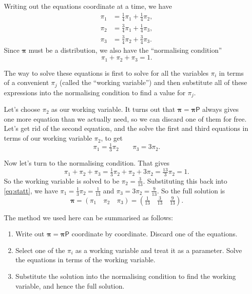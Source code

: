 \documentclass[
  a4paper,
]{article}
\providecommand{\tightlist}{%
  \setlength{\itemsep}{0pt}\setlength{\parskip}{0pt}}
\theoremstyle{definition}
\theoremstyle{definition}
\theoremstyle{definition}
\theoremstyle{remark}
\begin{document}
Writing out the equations coordinate at a time, we have
\begin{align*}
    \pi_1 &= \tfrac14\pi_1+\tfrac14\pi_2 , \\
    \pi_2 &= \tfrac34\pi_1+\tfrac14\pi_3 , \\
    \pi_3 &= \tfrac34\pi_2+\tfrac34\pi_3 . 
    \end{align*}
Since \(\boldsymbol\pi\) must be a distribution, we also have the ``normalising condition''
\[ \pi_1+\pi_2+\pi_3=1 . \]

The way to solve these equations is first to solve for all the variables \(\pi_i\) in terms of a convenient \(\pi_{j}\) (called the ``working variable'') and then substitute all of these expressions into the normalising condition to find a value for \(\pi_{j}\).

Let's choose \(\pi_2\) as our working variable. It turns out that \(\boldsymbol\pi = \boldsymbol\pi \mathsf{P}\) always gives one more equation than we actually need, so we can discard one of them for free. Let's get rid of the second equation, and the solve the first and third equations in terms of our working variable \(\pi_2\), to get
\begin{equation}
\pi_1=\tfrac13\pi_2 \qquad \pi_3=3\pi_2 . \label{eq:statt}
\end{equation}

Now let's turn to the normalising condition. That gives
\[ \pi_1+\pi_2+\pi_3 = \tfrac13\pi_2+\pi_2+3\pi_2 = \tfrac{13}{3} \pi_2 = 1 .\]
So the working variable is solved to be \(\pi_2 = \frac{3}{13}\). Substituting this back into \eqref{eq:statt}, we have \(\pi_1=\tfrac13\pi_2 = \frac{1}{13}\) and \(\pi_3=3\pi_2 = \frac{9}{13}\). So the full solution is
\[ \boldsymbol \pi = (\pi_1\quad \pi_2\quad \pi_3) = \left(\tfrac{1}{13}\quad \tfrac{3}{13}\quad\tfrac{9}{13}\right). \]

The method we used here can be summarised as follows:

\begin{enumerate}
\def\labelenumi{\arabic{enumi}.}
\tightlist
\item
  Write out \(\boldsymbol \pi = \boldsymbol \pi\mathsf P\) coordinate by coordinate. Discard one of the equations.
\item
  Select one of the \(\pi_i\) as a working variable and treat it as a parameter. Solve the equations in terms of the working variable.
\item
  Substitute the solution into the normalising condition to find the working variable, and hence the full solution.
\end{enumerate}
\end{document}
